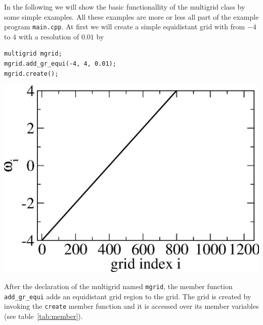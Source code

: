 \documentclass[a4paper]{scrreprt}
\begin{document}
In the following we will show the basic functionallity of the multigrid class by some simple examples. All these examples are more or less all part of the example program \texttt{main.cpp}. At first we will create a simple equidistant grid with from $-4$ to $4$ with a resolution of $0.01$ by 

\vspace{1cm}
\noindent\begin{minipage}[l]{0.6\textwidth}
\begin{lstlisting}
multigrid mgrid;
mgrid.add_gr_equi(-4, 4, 0.01);
mgrid.create();
\end{lstlisting}
\end{minipage}
\begin{minipage}[]{0.4\textwidth}
	\includegraphics[width=1.0\textwidth]{pics/multigrid_00.eps}
\end{minipage}

After the declaration of the multigrid named \texttt{mgrid}, the member function \texttt{add\_gr\_equi} adds an equidistant grid region to the grid. The grid is created by invoking the \texttt{create} member function and it is accessed over its member variables (see table~\ref{tab:member}). 
\end{document}
